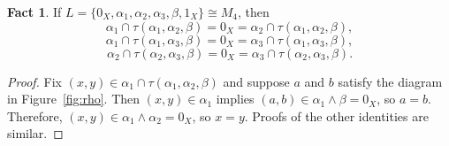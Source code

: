 \documentclass{amsart}
\theoremstyle{plain}
\theoremstyle{definition}
\newtheorem{fact}{Fact}[section]
\theoremstyle{definition}
\numberwithin{equation}{section}
\newcommand{\<}{\ensuremath{\langle}}
\renewcommand{\>}{\ensuremath{\rangle}}
\newcommand{\meet}{\ensuremath{\wedge}}
\begin{document}
\begin{fact} If 
$L = \{0_X, \alpha_1, \alpha_2, \alpha_3, \beta, 1_X\} \cong  M_4$,
then
  \[
\alpha_1 \cap \tau(\alpha_1, \alpha_2, \beta)
= 0_X =  \alpha_2 \cap \tau(\alpha_1, \alpha_2, \beta),
\]
\[
\alpha_1 \cap \tau(\alpha_1, \alpha_3, \beta)
= 0_X =  \alpha_3 \cap \tau(\alpha_1, \alpha_3, \beta),
\]
\[
\alpha_2 \cap \tau(\alpha_2, \alpha_3, \beta)
 = 0_X = \alpha_3 \cap \tau(\alpha_2, \alpha_3, \beta).
\]
\end{fact}
\begin{proof}
  Fix $(x,y) \in  \alpha_1 \cap \tau(\alpha_1, \alpha_2, \beta)$ and suppose 
  $a$ and $b$ satisfy the diagram in Figure~\ref{fig:rho}.  Then 
  $(x,y) \in \alpha_1$ implies $(a, b)\in \alpha_1 \meet \beta = 0_X$, so 
  $a = b$.  Therefore, $(x,y) \in \alpha_1 \meet \alpha_2 = 0_X$, so $x = y$.
  Proofs of the other identities are similar.
\end{proof}
\end{document}
